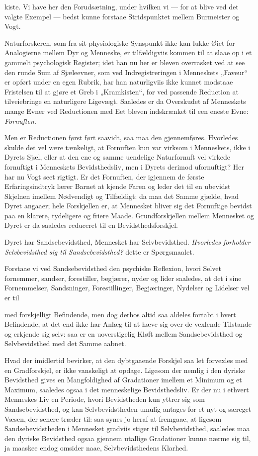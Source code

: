 \documentclass[12pt,a4paper]{book}
\begin{document}
kiste. Vi have her den Forudsætning, under hvilken vi --- for at blive ved det
valgte Exempel --- bedst kunne forstaae Stridspunktet mellem Burmeister og Vogt.

Naturforskeren, som fra sit physiologiske Synspunkt ikke kan lukke Øiet for
Analogierne mellem Dyr og Menneske, er tilfældigviis kommen til at slaae op i et
gammelt psychologisk Register; idet han nu her er bleven overrasket ved at see
den runde Sum af Sjæleevner, som ved Indregistreringen i Menneskets „Faveur“ er
opført under en egen Rubrik, har han naturligviis ikke kunnet modstaae
Fristelsen til at gjøre et Greb i „Kramkisten“, for ved passende Reduction at
tilveiebringe en naturligere Ligevægt. Saaledes er da Overskudet af Menneskets
mange Evner ved Reductionen med Eet bleven indskrænket til een eneste Evne:
\emph{Fornuften.}

Men er Reductionen først ført saavidt, saa maa den gjennemføres. Hvorledes
skulde det vel være tænkeligt, at Fornuften kun var virksom i Menneskets, ikke i
Dyrets Sjæl, eller at den ene og samme uendelige Naturfornuft vel virkede
fornuftigt i Menneskets Bevidsthedsliv, men i Dyrets derimod ufornuftigt? Her
har nu Vogt seet rigtigt. Er det Fornuften, der igjennem de første
Erfaringsindtryk lærer Barnet at kjende Faren og leder det til en ubevidst
Skjelnen imellem Nødvendigt og Tilfældigt: da maa det Samme gjælde, hvad Dyret
angaaer; hele Forskjellen er, at Mennesket bliver sig det Fornuftige bevidst paa
en klarere, tydeligere og friere Maade. Grundforskjellen mellem Mennesket og
Dyret er da saaledes reduceret til en Bevidsthedsforskjel.

Dyret har Sandsebevidsthed, Mennesket har Selvbevidsthed. \emph{Hvorledes
forholder Selvbevidsthed sig til Sandsebevidsthed?} dette er Spørgsmaalet.

Forstaae vi ved Sandsebevidsthed den psychiske Reflexion, hvori Selvet
fornemmer, sandser, forestiller, begjærer, nyder og lider saaledes, at det i sine
Fornemmelser, Sandsninger, Forestillinger, Begjæringer, Nydelser og Lidelser vel
er til

med forskjelligt Befindende, men dog derhos altid saa aldeles fortabt i hvert
Befindende, at det end ikke har Anlæg til at hæve sig over de vexlende Tilstande
og erkjende sig selv: saa er en uoverstigelig Kløft mellem Sandsebevidsthed og
Selvbevidsthed med det Samme aabnet.

Hvad der imidlertid bevirker, at den dybtgaaende Forskjel saa let forvexles med
en Gradforskjel, er ikke vanskeligt at opdage. Ligesom der nemlig i den dyriske
Bevidsthed gives en Mangfoldighed af Gradationer imellem et Minimum og et
Maximum, saaledes ogsaa i det menneskelige Bevidsthedsliv. Er der nu i ethvert
Menneskes Liv en Periode, hvori Bevidstheden kun yttrer sig som
Sandsebevidsthed, og kan Selvbevidstheden umulig antages for et nyt og særeget
Væsen, der senere træder til: saa synes jo heraf at fremgaae, at ligesom
Sandsebevidstheden i Mennesket gradviis stiger til Selvbevidsthed, saaledes maa
den dyriske Bevidsthed ogsaa gjennem utallige Gradationer kunne nærme sig til,
ja maaskee endog omsider naae, Selvbevidsthedens Klarhed.
\end{document}
